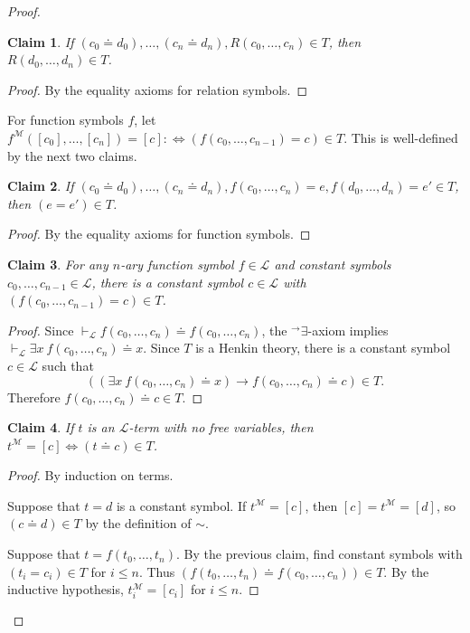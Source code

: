 \documentclass[a4paper, 11pt]{amsart}
\newtheorem*{claim*}{Claim}
\theoremstyle{remark}
\newcommand{\cL}{\mathcal L}
\newcommand{\cM}{\mathcal M}
\begin{document}
\begin{proof}
\begin{claim*}
If $ (c_0\doteq d_0) , \dots ,(c_n\doteq d_n), R(c_0,\dots, c_n) \in T$, then $ R(d_0,\dots, d_n) \in T$. 
\end{claim*} 
\begin{proof} 
By the equality axioms for relation symbols. 
\end{proof} 

For function symbols $f$, let $f^{\cM}([c_0],\dots, [c_n]) =[c] :\Longleftrightarrow (f(c_0,\dots, c_{n-1})=c) \in T$. 
This is well-defined by the next two claims. 

\begin{claim*}
If $ (c_0\doteq d_0) , \dots ,(c_n\doteq d_n), f(c_0,\dots, c_n)=e, f(d_0,\dots, d_n)=e' \in T$, then $ (e=e') \in T$. 
\end{claim*} 
\begin{proof} 
By the equality axioms for function symbols. 
\end{proof} 

\begin{claim*}
For any $n$-ary function symbol $f\in \cL$ and constant symbols $c_0,\dots,c_{n-1}\in \cL$, there is a constant symbol $c\in \cL$ with $(f(c_0,\dots, c_{n-1})=c) \in T$. 
\end{claim*} 
\begin{proof} 
Since $\vdash_\cL f(c_0,\dots,c_n) \doteq f(c_0,\dots,c_n)$, the ${}^\rightarrow\exists$-axiom implies $\vdash_\cL \exists x \ f(c_0,\dots,c_n)\doteq x$. 
Since $T$ is a Henkin theory, there is a constant symbol $c\in \cL$ such that 
$$( (\exists x\  f(c_0,\dots,c_n)\doteq x )  \rightarrow  f(c_0,\dots,c_n)\doteq c ) \in T.$$ 
Therefore $ f(c_0,\dots,c_n)\doteq c  \in T$. 
\end{proof} 


\begin{claim*}
If $t$ is an $\cL$-term with no free variables, then $t^{\cM}=[c] \Longleftrightarrow (t\doteq c)\in T$. 
\end{claim*} 
\begin{proof} 
By induction on terms. 

Suppose that $t=d$ is a constant symbol. 
If $t^\cM=[c]$, then $[c]=t^\cM=[d]$, so $(c\doteq d) \in T$ by the definition of $\sim$. 

Suppose that $t=f(t_0,\dots,t_n)$. 
By the previous claim, find constant symbols with $(t_i=c_i)\in T$ for $i\leq n$. 
Thus $(f(t_0,\dots,t_n)\doteq f(c_0,\dots,c_n))\in T$. 
By the inductive hypothesis, $t_i^\cM= [c_i]$ for $i\leq n$. 


\end{proof}
\end{proof}
\end{document}
